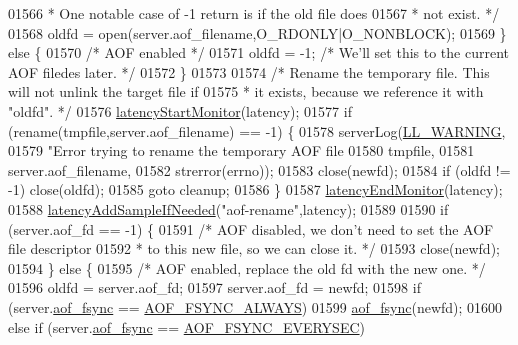 \begin{DoxyCode}
{{{{{{{{{{{{{{{{{{{{{{{{{{{{{{{{{01566 \textcolor{comment}{              * One notable case of -1 return is if the old file does}
01567 \textcolor{comment}{              * not exist. */}
01568              oldfd = open(server.aof\_filename,O\_RDONLY|O\_NONBLOCK);
01569         \} \textcolor{keywordflow}{else} \{
01570             \textcolor{comment}{/* AOF enabled */}
01571             oldfd = -1; \textcolor{comment}{/* We'll set this to the current AOF filedes later. */}
01572         \}
01573 
01574         \textcolor{comment}{/* Rename the temporary file. This will not unlink the target file if}
01575 \textcolor{comment}{         * it exists, because we reference it with "oldfd". */}
01576         \hyperlink{latency_8h_a87d7b5b368dad97457f13466d760b0e1}{latencyStartMonitor}(latency);
01577         \textcolor{keywordflow}{if} (rename(tmpfile,server.aof\_filename) == -1) \{
01578             serverLog(\hyperlink{server_8h_a31229b9334bba7d6be2a72970967a14b}{LL\_WARNING},
01579                 \textcolor{stringliteral}{"Error trying to rename the temporary AOF file %
01580                 tmpfile,
01581                 server.aof\_filename,
01582                 strerror(errno));
01583             close(newfd);
01584             \textcolor{keywordflow}{if} (oldfd != -1) close(oldfd);
01585             \textcolor{keywordflow}{goto} cleanup;
01586         \}
01587         \hyperlink{latency_8h_a88461aee20da0a648fe3332b5f068df7}{latencyEndMonitor}(latency);
01588         \hyperlink{latency_8h_a77922ab34035890c90f98831a9071359}{latencyAddSampleIfNeeded}(\textcolor{stringliteral}{"aof-rename"},latency);
01589 
01590         \textcolor{keywordflow}{if} (server.aof\_fd == -1) \{
01591             \textcolor{comment}{/* AOF disabled, we don't need to set the AOF file descriptor}
01592 \textcolor{comment}{             * to this new file, so we can close it. */}
01593             close(newfd);
01594         \} \textcolor{keywordflow}{else} \{
01595             \textcolor{comment}{/* AOF enabled, replace the old fd with the new one. */}
01596             oldfd = server.aof\_fd;
01597             server.aof\_fd = newfd;
01598             \textcolor{keywordflow}{if} (server.\hyperlink{config_8h_af5994c643c434574580bb7816af82cad}{aof\_fsync} == \hyperlink{server_8h_a83bfec10b7b4be60ec6d5868cadc73bb}{AOF\_FSYNC\_ALWAYS})
01599                 \hyperlink{config_8h_af5994c643c434574580bb7816af82cad}{aof\_fsync}(newfd);
01600             \textcolor{keywordflow}{else} \textcolor{keywordflow}{if} (server.\hyperlink{config_8h_af5994c643c434574580bb7816af82cad}{aof\_fsync} == \hyperlink{server_8h_a9784233b87ec796d0343556106fb778e}{AOF\_FSYNC\_EVERYSEC})
}}}}}}}}}}}}}}}}}}}}}}}}}}}}}}}}}}
\end{DoxyCode}

